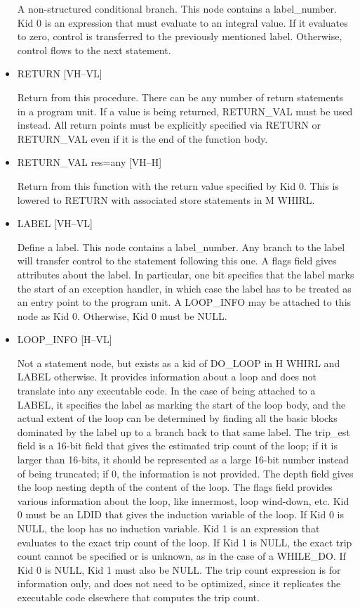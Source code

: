 \documentclass{article}
\begin{document}
\begin{itemize}
A non-structured conditional branch. This node contains a
label\_number. Kid 0 is an expression that must evaluate to an integral
value. If it evaluates to zero, control is transferred to the
previously mentioned label. Otherwise, control flows to the next
statement.

\item  RETURN \hfill [VH--VL]

Return from this procedure. There can be any number of return
statements in a program unit. If a value is being returned,
RETURN\_VAL must be used instead. All return points must be explicitly
specified via
RETURN or RETURN\_VAL even if it is the end of the function body.


\item  RETURN\_VAL res=any \hfill [VH--H]

Return from this function with the return value specified by Kid
0. This is lowered to
RETURN with associated store statements in M WHIRL.

\item  LABEL \hfill [VH--VL]

Define a label. This node contains a label\_number. Any branch to
the label will transfer control to the statement following this
one. A flags field
gives attributes about the label. In particular, one bit specifies
that the label marks the start of an exception handler, in which
case the label has to be treated as an entry point to the program
unit. A LOOP\_INFO may be attached to this node as Kid 0. Otherwise,
Kid 0 must be NULL.

\item  LOOP\_INFO \hfill \hfill [H--VL]

Not a statement node, but exists as a kid of DO\_LOOP in H WHIRL
and LABEL otherwise. It provides information about a loop and does
not translate into any executable code. In the case of being attached
to a LABEL, it specifies the label as marking the start of the loop
body, and the actual extent of the loop can be determined by finding
all the basic blocks
dominated by the label up to a branch back to that same label.
The trip\_est field is a 16-bit field that gives the estimated trip
count of the loop; if it is larger than 16-bits, it should be
represented as a large 16-bit number instead of being truncated; if
0, the information is not provided. The depth field gives the loop
nesting depth of the content of the loop. The flags field provides
various information about the loop, like innermost, loop wind-down,
etc. Kid 0 must be an LDID that gives the induction variable of
the loop. If Kid 0 is NULL, the loop has no induction variable.
Kid 1 is an expression that evaluates to the exact trip count of         the
loop. If Kid 1 is NULL, the exact trip count cannot be specified
or is unknown, as in the case of a WHILE\_DO. If Kid 0 is NULL, Kid
1 must also be NULL. The trip count expression is for information
only, and does not need to be optimized, since it replicates the
executable code elsewhere that computes the trip count.

\end{itemize}
\end{document}
